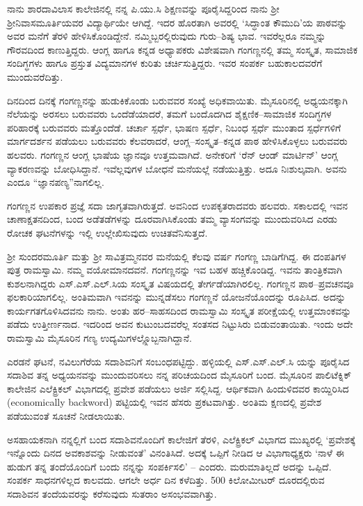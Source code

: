 ನಾನು ಶಾರದಾವಿಲಾಸ ಕಾಲೇಜಿನಲ್ಲಿ ನನ್ನ ಪಿ.ಯು.ಸಿ ಶಿಕ್ಷಣವನ್ನು ಪೂರೈಸಿದ್ದರಿಂದ ನಾನು ಶ್ರೀ ಶ್ರೀನಿವಾಸಮೂರ್ತಿಯವರ ವಿದ್ಯಾರ್ಥಿಯೇ ಆಗಿದ್ದೆ. ಇದರ ಹೊರತಾಗಿ ಅವರಲ್ಲಿ ‘ಸಿದ್ಧಾಂತ ಕೌಮುದಿ’ಯ ಪಾಠವನ್ನು ಅವರ ಮನೆಗೆ ತೆರಳಿ ಹೇಳಿಸಿಕೊಂಡಿದ್ದೇನೆ. ನಮ್ಮಿಬ್ಬರಲ್ಲಿರುವುದು ಗುರು–ಶಿಷ್ಯ ಭಾವ. ಇವರೆಲ್ಲರೂ ನಮ್ಮನ್ನು ಗೌರವದಿಂದ ಕಾಣುತ್ತಿದ್ದರು. ಆಂಗ್ಲ ಹಾಗೂ ಕನ್ನಡ ಅಧ್ಯಾಪಕರು ವಿಶೇಷವಾಗಿ ಗಂಗಣ್ಣನಲ್ಲಿ ತಮ್ಮ ಸಂಸ್ಕೃತ, ಸಾಮಾಜಿಕ ಸಂದಿಗ್ಧಗಳು ಹಾಗೂ ಪ್ರಸ್ತುತ ವಿದ್ಯಮಾನಗಳ ಕುರಿತು ಚರ್ಚಿಸುತ್ತಿದ್ದರು. ಇವರ ಸಂಪರ್ಕ ಬಹುಕಾಲದವರೆಗೆ ಮುಂದುವರೆದಿತ್ತು.

ದಿನದಿಂದ ದಿನಕ್ಕೆ ಗಂಗಣ್ಣನನ್ನು ಹುಡುಕಿಕೊಂಡು ಬರುವವರ ಸಂಖ್ಯೆ ಅಧಿಕವಾಯಿತು. ಮೈಸೂರಿನಲ್ಲಿ ಅಧ್ಯಯನಕ್ಕಾಗಿ ನೆಲೆಯನ್ನು ಅರಸಲು ಬರುವವರು ಒಂದೆಡೆಯಾದರೆ, ತಮಗೆ ಬಂದೊದಗಿದ ಶೈಕ್ಷಣಿಕ–ಸಾಮಾಜಿಕ ಸಂದಿಗ್ಧಗಳ ಪರಿಹಾರಕ್ಕೆ ಬರುವವರು ಮತ್ತೊಂದೆಡೆ. ಚರ್ಚಾ ಸ್ಪರ್ಧೆ, ಭಾಷಣ ಸ್ಪರ್ಧೆ, ನಿಬಂಧ ಸ್ಪರ್ಧೆ ಮುಂತಾದ ಸ್ಪರ್ಧೆಗಳಿಗೆ ಮಾರ್ಗದರ್ಶನ ಪಡೆಯಲು ಬರುವವರು ಕೆಲವರಾದರೆ, ಆಂಗ್ಲ–ಸಂಸ್ಕೃತ–ಕನ್ನಡ ಪಾಠ ಹೇಳಿಸಿಕೊಳ್ಳಲು ಬರುವವರು ಹಲವರು. ಗಂಗಣ್ಣನ ಆಂಗ್ಲ ಭಾಷೆಯ ಜ್ಞಾನವೂ ಉತ್ತಮವಾಗಿದೆ. ಅನೇಕರಿಗೆ ‘ರೆನ್ ಆಂಡ್ ಮಾರ್ಟಿನ್’ ಆಂಗ್ಲ ವ್ಯಾಕರಣವನ್ನು ಬೋಧಿಸಿದ್ದಾನೆ. ಇವೆಲ್ಲವುಗಳ ಬೋಧನೆ ಮನೆಯಲ್ಲೆ ನಡೆಯುತ್ತಿತ್ತು. ಅದೂ ನಿಃಶುಲ್ಕವಾಗಿ. ಅವನು ಎಂದೂ “ಜ್ಞಾನಪಣ್ಯ”ನಾಗಲಿಲ್ಲ.

ಗಂಗಣ್ಣನ ಉಪಕಾರ ಪ್ರಜ್ಞೆ ಸದಾ ಜಾಗೃತವಾಗಿರುತ್ತದೆ. ಅವನಿಂದ ಉಪಕೃತರಾದವರು ಹಲವರು. ಸಕಾಲದಲ್ಲಿ ಇವನ ಚಾಣಾಕ್ಷತನದಿಂದ, ಬಂದ ಅಡೆತಡೆಗಳನ್ನು ದೂರವಾಗಿಸಿಕೊಂಡು ತಮ್ಮ ವ್ಯಾಸಂಗವನ್ನು ಮುಂದುವರಿಸಿದ ಎರಡು ರೋಚಕ ಘಟನೆಗಳನ್ನು ಇಲ್ಲಿ ಉಲ್ಲೇಖಿಸುವುದು ಉಚಿತವೆನಿಸುತ್ತದೆ.

ಶ್ರೀ ಸುಂದರಮೂರ್ತಿ ಮತ್ತು ಶ್ರೀ ಸಾವಿತ್ರಮ್ಮನವರ ಮನೆಯಲ್ಲಿ ಕೆಲವು ವರ್ಷ ಗಂಗಣ್ಣ ಬಾಡಿಗೆಗಿದ್ದ. ಈ ದಂಪತಿಗಳ ಪುತ್ರ ರಾಮಸ್ವಾಮಿ. ನಮ್ಮ ವಯೋಮಾನದವನೆ. ಗಂಗಣ್ಣನನ್ನು ಇವ ಬಹಳ ಹಚ್ಚಿಕೊಂಡಿದ್ದ. ಇವನು ತಾಂತ್ರಿಕವಾಗಿ ಕುಶಲನಾಗಿದ್ದರು ಎಸ್.ಎಸ್.ಎಲ್.ಸಿಯ ಸಂಸ್ಕೃತ ವಿಷಯದಲ್ಲಿ ತೇರ್ಗಡೆಯಾಗಿರಲಿಲ್ಲ. ಗಂಗಣ್ಣನ ಪಾಠ–ಪ್ರವಚನವೂ ಫಲಕಾರಿಯಾಗಲಿಲ್ಲ. ಅಂತಿಮವಾಗಿ ಇವನನ್ನು ಮುನ್ನಡೆಸಲು ಗಂಗಣ್ಣನೆ ಯೋಜನೆಯೊಂದನ್ನು ರೂಪಿಸಿದ. ಅದನ್ನು ಕಾರ್ಯಗತಗೊಳಿಸಿದವನು ನಾನು. ಅಂತು ಹರ–ಸಾಹಸದಿಂದ ರಾಮಸ್ವಾಮಿ ಸಂಸ್ಕೃತ ಪರೀಕ್ಷೆಯಲ್ಲಿ ಉತ್ತಮಾಂಕವನ್ನು ಪಡೆದು ಉತ್ತೀರ್ಣನಾದ. ಇದರಿಂದ ಅವನ ಕುಟುಂಬದವರೆಲ್ಲ ಸಂತಸದ ನಿಟ್ಟುಸಿರು ಬಿಡುವಂತಾಯಿತು. ಇಂದು ಅದೇ ರಾಮಸ್ವಾಮಿ ಮೈಸೂರಿನ ಗಣ್ಯ ಉದ್ಯಮಿಗಳಲ್ಲ್ಲೊಬ್ಬನಾಗಿದ್ದಾನೆ.

ಎರಡನೆ ಘಟನೆ, ನವಿಲುಗೆರೆಯ ಸದಾಶಿವನಿಗೆ ಸಂಬಂಧಪಟ್ಟಿದ್ದು. ಹಳ್ಳಿಯಲ್ಲಿ ಎಸ್.ಎಸ್.ಎಲ್.ಸಿ ಯನ್ನು ಪೂರೈಸಿದ ಸದಾಶಿವ ತನ್ನ ಅಧ್ಯಯನವನ್ನು ಮುಂದುವರಿಸಲು ನನ್ನ ಪರಿಚಯದಿಂದ ಮೈಸೂರಿಗೆ ಬಂದ. ಮೈಸೂರಿನ ಪಾಲಿಟೆಕ್ನಿಕ್ ಕಾಲೇಜಿನ ಎಲೆಕ್ಟ್ರಿಕಲ್ ವಿಭಾಗದಲ್ಲಿ ಪ್ರವೇಶ ಪಡೆಯಲು ಅರ್ಜಿ ಸಲ್ಲಿಸಿದ್ದ. ಆರ್ಥಿಕವಾಗಿ ಹಿಂದುಳಿದವರ ಕಾಯ್ದಿರಿಸಿದ (economically backword) ಪಟ್ಟಿಯಲ್ಲಿ ಇವನ ಹೆಸರು ಪ್ರಕಟವಾಗಿತ್ತು. ಅಂತಿಮ ಕ್ಷಣದಲ್ಲಿ ಪ್ರವೇಶ ಪಡೆಯುವಂತೆ ಸೂಚನೆ ನೀಡಲಾಯಿತು.

ಅಸಹಾಯಕನಾಗಿ ನನ್ನಲ್ಲಿಗೆ ಬಂದ ಸದಾಶಿವನೊಂದಿಗೆ ಕಾಲೇಜಿಗೆ ತೆರಳಿ, ಎಲೆಕ್ಟ್ರಿಕಲ್ ವಿಭಾಗದ ಮುಖ್ಯರಲ್ಲಿ ‘ಪ್ರವೇಶಕ್ಕೆ ಇನ್ನೊಂದು ದಿನದ ಅವಕಾಶವನ್ನು ನೀಡುವಂತೆ’ ವಿನಂತಿಸಿದೆ. ಅದಕ್ಕೆ ಒಪ್ಪಿಗೆ ನೀಡಿದ ಆ ವಿಭಾಗಾಧ್ಯಕ್ಷರು ‘ನಾಳೆ ಈ ಹುಡುಗ ತನ್ನ ತಂದೆಯೊಂದಿಗೆ ಬಂದು ನನ್ನನ್ನು ಸಂಪರ್ಕಿಸಲಿ’ – ಎಂದರು. ಮರುಮಾತಿಲ್ಲದೆ ಅದನ್ನು ಒಪ್ಪಿದೆ. ಸಂಪರ್ಕ ಸಾಧನಗಳಿಲ್ಲದ ಕಾಲವದು. ಆಗಲೇ ಅರ್ಧ ದಿನ ಕಳೆದಿತ್ತು. 500 ಕಿಲೋಮೀಟರ್ ದೂರದಲ್ಲಿರುವ ಸದಾಶಿವನ ತಂದೆಯವರನ್ನು ಕರೆಸುವುದು ಸುತರಾಂ ಅಸಂಭವವಾಗಿತ್ತು. 

